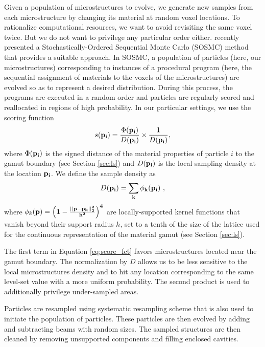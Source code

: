 Given a population of microstructures to evolve, we generate new samples from each microstructure by changing its material at random voxel locations. To rationalize computational resources, we want to avoid revisiting the same voxel twice. But we do not want to privilege any particular order either. \citet{Ritchie2015SOCM} recently presented a Stochastically-Ordered Sequential Monte Carlo (SOSMC) method that provides a suitable approach.
In SOSMC, a population of particles (here, our microstructures) corresponding to instances of a procedural program (here, the sequential assignment of materials to the voxels of the microstructures) are evolved so as to represent a desired distribution. During this process, the programs are executed in a random order and particles are regularly scored and reallocated in regions of high probability. In our particular settings, we use the scoring function
\begin{equation}
s(\mathbf{p_i}) = \frac{\Phi(\bf p_i)}{D(\bf p_i)} \times \frac{1}{D(\bf p_i)},
\label{eq:score_fct}
\end{equation}
where $\Phi(\bf p_i)$ is the signed distance of the material properties of particle $i$ to the gamut boundary (see Section \ref{sec:ls}) and $D(\bf p_i)$ is the local sampling density at the location $\bf p_i$. We define the sample density as
\begin{equation}
D(\bf p_i)=\sum_{k}\phi_{k}(\bf p_i)\ ,
\end{equation}
where $\phi_{k}(\bf p)=\left(1-\frac{||\bf p-\bf p_{k}||^{2}_{2}}{h^{2}}\right)^{4}$ are locally-supported kernel functions that vanish beyond their support radius $h$, set to a tenth of the size of the lattice used for the continuous representation of the material gamut (see Section \ref{sec:ls}).

The first term in Equation \ref{eq:score_fct} favors microstructures located near the gamut boundary. The normalization by $D$ allows us to be less sensitive to the local microstructures density and to hit any location corresponding to the same level-set value with a more uniform probability. The second product is used to additionally privilege under-sampled areas.

Particles are resampled using systematic resampling scheme \citep{Douc05resamplingSchmes} that is also used to initiate the population of particles. These particles are then evolved by adding and subtracting beams with random sizes. The sampled structures are then cleaned by removing unsupported components and filling enclosed cavities.

